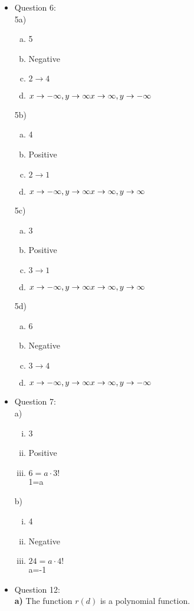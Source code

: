 \documentclass{article}
\begin{document}
\begin{itemize}
    \item Question 6: \\
5a)
\begin{enumerate}[a)]
        \item 5 
        \item Negative 
        \item $2 \to 4$ 
        \item $x\to -\infty, y\to \infty\\ x\to \infty, y\to -\infty$ 
\end{enumerate}
5b)
\begin{enumerate}[a)]
        \item 4 
        \item Positive 
        \item $2 \to 1$ 
        \item $x\to -\infty, y\to \infty\\ x\to \infty, y\to \infty$ 
\end{enumerate}
5c)
\begin{enumerate}[a)]
        \item 3 
        \item Positive 
        \item $3 \to 1$ 
        \item $x\to -\infty, y\to \infty\\ x\to \infty, y\to \infty$ 
\end{enumerate}
\newpage 
5d)
\begin{enumerate}[a)]
        \item 6 
        \item Negative 
        \item $3 \to 4$ 
        \item $x\to -\infty, y\to \infty\\ x\to \infty, y\to -\infty$ 
\end{enumerate}
    
    \item Question 7: \\
    a)
    \begin{enumerate}[i)]
        \item 3
        \item Positive
        \item $6=a\cdot3!$\\ 1=a
    \end{enumerate}
    b)
    \begin{enumerate}[i)]
        \item 4
        \item Negative
        \item $24=a\cdot4!$\\ a=-1
    \end{enumerate}
    \item Question 12: \\
    \textbf{a)} The function $r(d)$ is a polynomial function.


\end{itemize}
\end{document}
